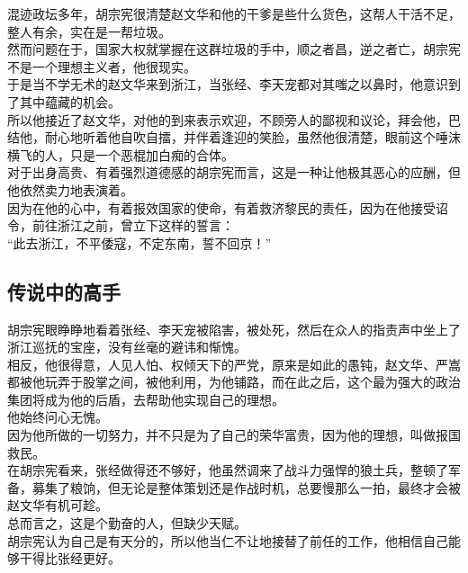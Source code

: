 \begin{multicols}{\theparacolNo}
混迹政坛多年，胡宗宪很清楚赵文华和他的干爹是些什么货色，这帮人干活不足，整人有余，实在是一帮垃圾。\\

然而问题在于，国家大权就掌握在这群垃圾的手中，顺之者昌，逆之者亡，胡宗宪不是一个理想主义者，他很现实。\\

于是当不学无术的赵文华来到浙江，当张经、李天宠都对其嗤之以鼻时，他意识到了其中蕴藏的机会。\\

所以他接近了赵文华，对他的到来表示欢迎，不顾旁人的鄙视和议论，拜会他，巴结他，耐心地听着他自吹自擂，并伴着逢迎的笑脸，虽然他很清楚，眼前这个唾沫横飞的人，只是一个恶棍加白痴的合体。\\

对于出身高贵、有着强烈道德感的胡宗宪而言，这是一种让他极其恶心的应酬，但他依然卖力地表演着。\\

因为在他的心中，有着报效国家的使命，有着救济黎民的责任，因为在他接受诏令，前往浙江之前，曾立下这样的誓言：\\

“此去浙江，不平倭寇，不定东南，誓不回京！”\\

\subsection{传说中的高手}
胡宗宪眼睁睁地看着张经、李天宠被陷害，被处死，然后在众人的指责声中坐上了浙江巡抚的宝座，没有丝毫的避讳和惭愧。\\

相反，他很得意，人见人怕、权倾天下的严党，原来是如此的愚钝，赵文华、严嵩都被他玩弄于股掌之间，被他利用，为他铺路，而在此之后，这个最为强大的政治集团将成为他的后盾，去帮助他实现自己的理想。\\

他始终问心无愧。\\

因为他所做的一切努力，并不只是为了自己的荣华富贵，因为他的理想，叫做报国救民。\\

在胡宗宪看来，张经做得还不够好，他虽然调来了战斗力强悍的狼土兵，整顿了军备，募集了粮饷，但无论是整体策划还是作战时机，总要慢那么一拍，最终才会被赵文华有机可趁。\\

总而言之，这是个勤奋的人，但缺少天赋。\\

胡宗宪认为自己是有天分的，所以他当仁不让地接替了前任的工作，他相信自己能够干得比张经更好。\\


\end{multicols}
